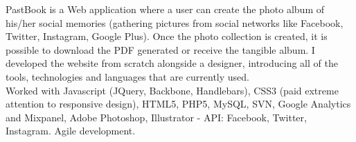 \documentclass[11pt,a4paper]{moderncv-mod}
\begin{document}
{PastBook is a Web application where a user can create the photo album of his/her social memories (gathering pictures from social networks like Facebook, Twitter, Instagram, Google Plus). Once the photo collection is created, it is possible to download the PDF generated or receive the tangible album.
I developed the website from scratch alongside a designer, introducing all of the tools, technologies and languages that are currently used.\\
Worked with Javascript (JQuery, Backbone, Handlebars), CSS3 (paid extreme attention to responsive design), HTML5, PHP5, MySQL, SVN, Google Analytics and Mixpanel, Adobe Photoshop, Illustrator - API: Facebook, Twitter, Instagram. Agile development.
}
\end{document}
